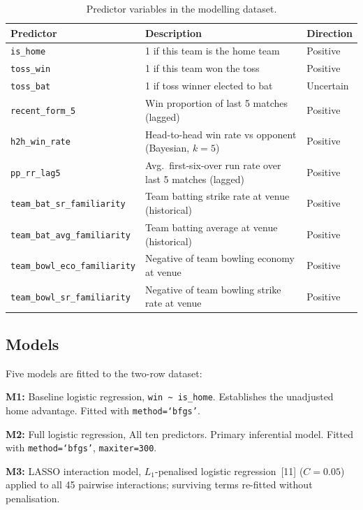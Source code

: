 \documentclass[12pt,a4paper]{article}
\begin{document}
\begin{table}[H]
\centering
\caption{Predictor variables in the modelling dataset.}
\label{tab:predictors}
\small
\begin{tabularx}{\textwidth}{lXl}
\toprule
\textbf{Predictor} & \textbf{Description} & \textbf{Direction} \\
\midrule
\texttt{is\_home} & 1 if this team is the home team & Positive \\
\texttt{toss\_win} & 1 if this team won the toss & Positive \\
\texttt{toss\_bat} & 1 if toss winner elected to bat & Uncertain \\
\texttt{recent\_form\_5} & Win proportion of last 5 matches (lagged) & Positive \\
\texttt{h2h\_win\_rate} & Head-to-head win rate vs opponent (Bayesian, $k=5$) & Positive \\
\texttt{pp\_rr\_lag5} & Avg.\ first-six-over run rate over last 5 matches (lagged) & Positive \\
\texttt{team\_bat\_sr\_familiarity} & Team batting strike rate at venue (historical) & Positive \\
\texttt{team\_bat\_avg\_familiarity} & Team batting average at venue (historical) & Positive \\
\texttt{team\_bowl\_eco\_familiarity} & Negative of team bowling economy at venue & Positive \\
\texttt{team\_bowl\_sr\_familiarity} & Negative of team bowling strike rate at venue & Positive \\
\bottomrule
\end{tabularx}
\end{table}

\subsection{Models}

Five models are fitted to the two-row dataset:

\textbf{M1:} Baseline logistic regression, \texttt{win \textasciitilde\ is\_home}.
Establishes the unadjusted home advantage. Fitted with \texttt{method=`bfgs'}.

\textbf{M2:} Full logistic regression, All ten predictors. Primary inferential model.
Fitted with \texttt{method=`bfgs'}, \texttt{maxiter=300}.

\textbf{M3:} LASSO interaction model, $L_1$-penalised logistic regression~[11]
($C = 0.05$) applied to all 45 pairwise interactions; surviving terms re-fitted without
penalisation.
\end{document}
